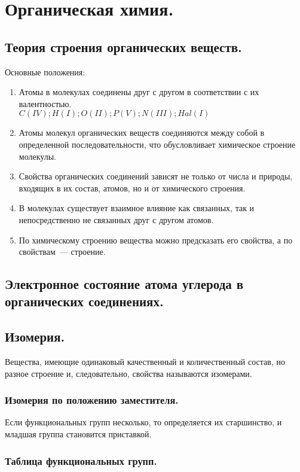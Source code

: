 \documentclass{article}
\begin{document}
	\tableofcontents
	\setcounter{tocdepth}{3}
	\newpage
	\section{Органическая химия.}
	\subsection{Теория строения органических веществ.}
	\begin{definition}
		Основные положения:
		\begin{enumerate}
			\item Атомы в молекулах соединены друг с другом в соответствии с их валентностью. \\
			$C (IV); H (I); O (II); P (V); N (III); Hal (I)$
			\item Атомы молекул органических веществ соединяются между собой в определенной последовательности, что обусловливает химическое строение молекулы.
			\item Свойства органических соединений зависят не только от числа и природы, входящих в их состав, атомов, но и от химического строения.
			\item В молекулах существует взаимное влияние как связанных, так и непосредственно не связанных друг с другом атомов.
			\item По химическому строению вещества можно предсказать его свойства, а по свойствам~--- строение.
		\end{enumerate}
	\end{definition}
	\subsection{Электронное состояние атома углерода в органических соединениях.}
	\subsection{Изомерия.}
	\begin{definition}
		Вещества, имеющие одинаковый качественный и количественный состав, но разное строение и, следовательно, свойства называются изомерами.
	\end{definition}
	\subsubsection{Изомерия по положению заместителя.}
	\begin{note}
		Если функциональных групп несколько, то определяется их старшинство, и младшая группа становится приставкой.
	\end{note}
	\subsubsection{Таблица функциональных групп.}
\end{document}
